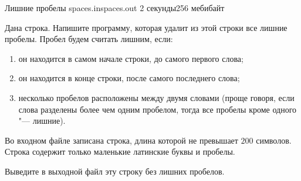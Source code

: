 \begin{problem}{Лишние пробелы}
{spaces.in}{spaces.out}
{2 секунды}{256 мебибайт}{}


Дана строка. Напишите программу, которая удалит из этой строки
все лишние пробелы. Пробел будем считать лишним, если:
\begin{enumerate}
\item он находится в самом начале строки, до самого первого слова;
\item он находится в конце строки, после самого последнего слова;
\item несколько пробелов расположены между двумя словами (проще говоря,
если слова разделены более чем 
одним пробелом, тогда все пробелы кроме одного "--- лишние).
\end{enumerate}

\InputFile

Во входном файле записана строка, длина которой не превышает $200$ символов.
Строка содержит только маленькие латинские буквы и пробелы.

\OutputFile

Выведите в выходной файл эту строку без лишних пробелов.

\Examples

\begin{example}
%
\end{example}

\end{problem}
